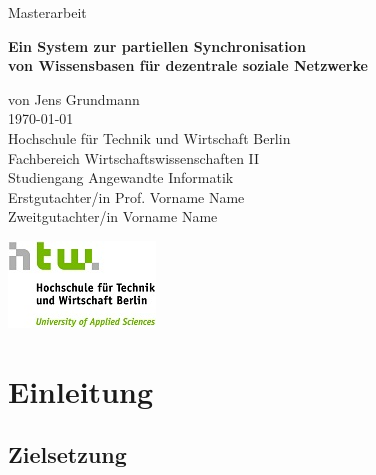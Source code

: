 \documentclass[a4paper]{article}
\begin{document}
	\begin{titlepage}
		\begin{flushright}	
			{\large Masterarbeit \\}
			\begin{Large}
				\textbf{
					Ein System zur partiellen Synchronisation \\ 
					von Wissensbasen für dezentrale soziale Netzwerke \\
				} 
			\end{Large}
			\vspace{1.0cm}
			\begin{large}	
				von Jens Grundmann \\
				\today \\
				\vspace{1.0cm}
				Hochschule für Technik und Wirtschaft Berlin \\
				Fachbereich Wirtschaftswissenschaften II \\
				Studiengang Angewandte Informatik \\
				\vspace{1.0cm}
				Erstgutachter/in Prof. Vorname Name \\
				Zweitgutachter/in Vorname Name \\	
				\vspace{0.5cm}
				\begin{center}
					\includegraphics{../Bilder/htw_logo.jpg}
				\end{center}				
			\end{large}
		\end{flushright}	
	\end{titlepage}
	
	\ClearWallPaper
	\tableofcontents
	\newpage

	\section{Einleitung}

	\subsection{Zielsetzung}
	
\end{document}
